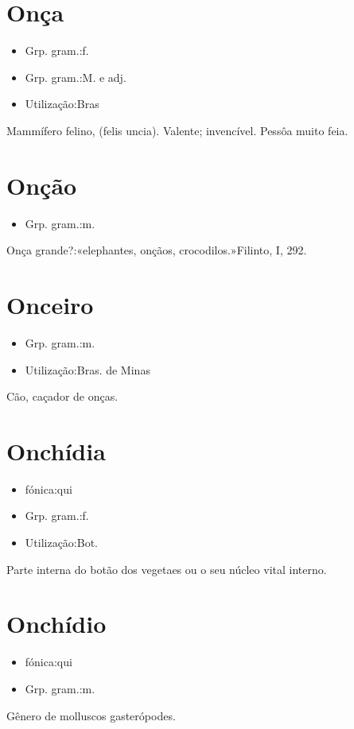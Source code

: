 \section{Onça}
\begin{itemize}
\item {Grp. gram.:f.}
\end{itemize}
\begin{itemize}
\item {Grp. gram.:M.  e  adj.}
\end{itemize}
\begin{itemize}
\item {Utilização:Bras}
\end{itemize}
Mammífero felino, (\textunderscore felis uncia\textunderscore ).
Valente; invencível.
Pessôa muito feia.
\section{Onção}
\begin{itemize}
\item {Grp. gram.:m.}
\end{itemize}
Onça grande?:«\textunderscore elephantes, onçãos, crocodilos.\textunderscore »Filinto, I, 292.
\section{Onceiro}
\begin{itemize}
\item {Grp. gram.:m.}
\end{itemize}
\begin{itemize}
\item {Utilização:Bras. de Minas}
\end{itemize}
Cão, caçador de onças.
\section{Onchídia}
\begin{itemize}
\item {fónica:qui}
\end{itemize}
\begin{itemize}
\item {Grp. gram.:f.}
\end{itemize}
\begin{itemize}
\item {Utilização:Bot.}
\end{itemize}
Parte interna do botão dos vegetaes ou o seu núcleo vital interno.
\section{Onchídio}
\begin{itemize}
\item {fónica:qui}
\end{itemize}
\begin{itemize}
\item {Grp. gram.:m.}
\end{itemize}
Gênero de molluscos gasterópodes.
